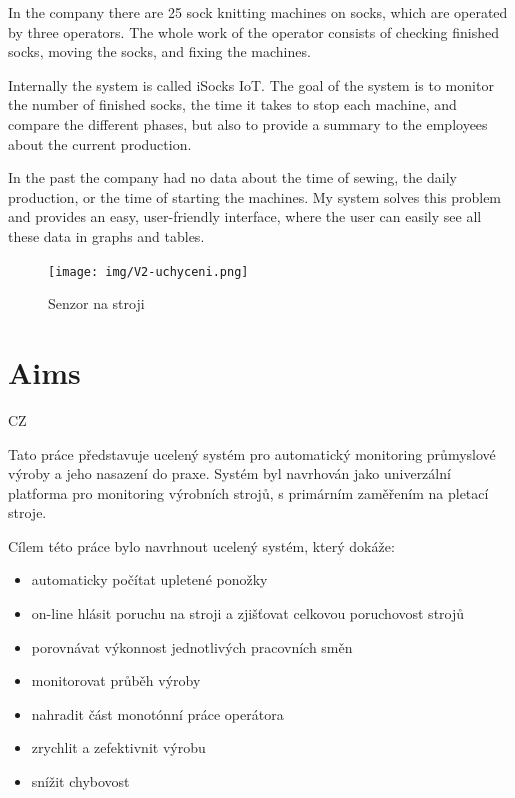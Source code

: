 \documentclass[12pt, a4paper]{article}
\begin{document}
In the company there are 25 sock knitting machines on socks, which are operated by three operators.
The whole work of the operator consists of checking finished socks, moving the socks, and fixing the machines.

Internally the system is called iSocks IoT.
The goal of the system is to monitor the number of finished socks, the time it takes to stop each machine, and compare the different phases, but also to provide a summary to the employees about the current production.

In the past the company had no data about the time of sewing, the daily production, or the time of starting the machines.
My system solves this problem and provides an easy, user-friendly interface, where the user can easily see all these data in graphs and tables.


\begin{figure}[t]
    \centering
    \texttt{[image: img/V2-uchyceni.png]}
    \caption{Senzor na stroji}
    \label{fig:SenzorNaStroji}
\end{figure}


\section*{Aims}
CZ

Tato práce představuje ucelený systém pro automatický monitoring průmyslové výroby a jeho nasazení do praxe.
Systém byl navrhován jako univerzální platforma pro monitoring výrobních strojů, s primárním zaměřením na pletací stroje.

Cílem této práce bylo navrhnout ucelený systém, který dokáže:

\begin{itemize}
    \item automaticky počítat upletené ponožky
    \item on-line hlásit poruchu na stroji a zjišťovat celkovou poruchovost strojů
    \item porovnávat výkonnost jednotlivých pracovních směn
    \item monitorovat průběh výroby
    \item nahradit část monotónní práce operátora
    \item zrychlit a zefektivnit výrobu
    \item snížit chybovost
\end{itemize}
\end{document}
